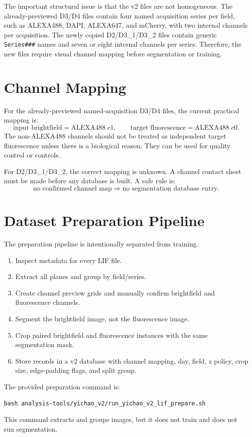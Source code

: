 \documentclass[11pt]{article}
\begin{document}
The important structural issue is that the v2 files are not homogeneous. The already-previewed D3/D4 files contain four named acquisition series per field, such as ALEXA488, DAPI, ALEXA647, and mCherry, with two internal channels per acquisition. The newly copied D2/D3\_1/D3\_2 files contain generic \texttt{Series\#\#\#} names and seven or eight internal channels per series. Therefore, the new files require visual channel mapping before segmentation or training.

\section{Channel Mapping}
For the already-previewed named-acquisition D3/D4 files, the current practical mapping is:
\[
\text{input brightfield} = \mathrm{ALEXA488}\;c1,\qquad
\text{target fluorescence} = \mathrm{ALEXA488}\;c0.
\]
The non-ALEXA488 channels should not be treated as independent target fluorescence unless there is a biological reason. They can be used for quality control or controls.

For D2/D3\_1/D3\_2, the correct mapping is unknown. A channel contact sheet must be made before any database is built. A safe rule is:
\[
\text{no confirmed channel map} \Rightarrow \text{no segmentation database entry}.
\]

\section{Dataset Preparation Pipeline}
The preparation pipeline is intentionally separated from training.

\begin{enumerate}[leftmargin=1.5em]
  \item Inspect metadata for every LIF file.
  \item Extract all planes and group by field/series.
  \item Create channel preview grids and manually confirm brightfield and fluorescence channels.
  \item Segment the brightfield image, not the fluorescence image.
  \item Crop paired brightfield and fluorescence instances with the same segmentation mask.
  \item Store records in a v2 database with channel mapping, day, field, z policy, crop size, edge-padding flags, and split group.
\end{enumerate}

The provided preparation command is:
\begin{verbatim}
bash analysis-tools/yichao_v2/run_yichao_v2_lif_prepare.sh
\end{verbatim}
This command extracts and groups images, but it does not train and does not run segmentation.
\end{document}
